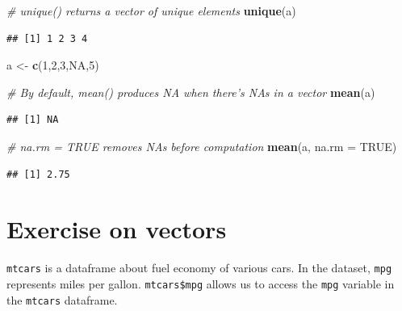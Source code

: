 \documentclass[]{book}
\newenvironment{Shaded}{\begin{snugshade}}{\end{snugshade}}
\newcommand{\KeywordTok}[1]{\textcolor[rgb]{0.13,0.29,0.53}{\textbf{{#1}}}}
\newcommand{\DataTypeTok}[1]{\textcolor[rgb]{0.13,0.29,0.53}{{#1}}}
\newcommand{\DecValTok}[1]{\textcolor[rgb]{0.00,0.00,0.81}{{#1}}}
\newcommand{\StringTok}[1]{\textcolor[rgb]{0.31,0.60,0.02}{{#1}}}
\newcommand{\CommentTok}[1]{\textcolor[rgb]{0.56,0.35,0.01}{\textit{{#1}}}}
\newcommand{\OtherTok}[1]{\textcolor[rgb]{0.56,0.35,0.01}{{#1}}}
\newcommand{\NormalTok}[1]{{#1}}
\begin{document}
\begin{Shaded}
\begin{Highlighting}[]
\CommentTok{# unique() returns a vector of unique elements}
\KeywordTok{unique}\NormalTok{(a)}
\end{Highlighting}
\end{Shaded}

\begin{verbatim}
## [1] 1 2 3 4
\end{verbatim}

\begin{Shaded}
\begin{Highlighting}[]
\NormalTok{a <-}\StringTok{ }\KeywordTok{c}\NormalTok{(}\DecValTok{1}\NormalTok{,}\DecValTok{2}\NormalTok{,}\DecValTok{3}\NormalTok{,}\OtherTok{NA}\NormalTok{,}\DecValTok{5}\NormalTok{)}
\end{Highlighting}
\end{Shaded}

\begin{Shaded}
\begin{Highlighting}[]
\CommentTok{# By default, mean() produces NA when there's NAs in a vector}
\KeywordTok{mean}\NormalTok{(a)}
\end{Highlighting}
\end{Shaded}

\begin{verbatim}
## [1] NA
\end{verbatim}

\begin{Shaded}
\begin{Highlighting}[]
\CommentTok{# na.rm = TRUE removes NAs before computation}
\KeywordTok{mean}\NormalTok{(a, }\DataTypeTok{na.rm =} \OtherTok{TRUE}\NormalTok{)}
\end{Highlighting}
\end{Shaded}

\begin{verbatim}
## [1] 2.75
\end{verbatim}

\section{Exercise on vectors}\label{exercise-on-vectors}

\texttt{mtcars} is a dataframe about fuel economy of various cars. In
the dataset, \texttt{mpg} represents miles per gallon.
\texttt{mtcars\$mpg} allows us to access the \texttt{mpg} variable in
the \texttt{mtcars} dataframe.
\end{document}
